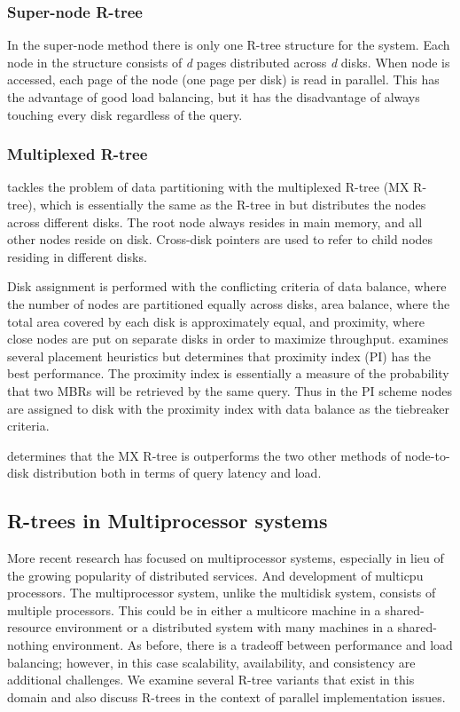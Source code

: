 \subsubsection{Super-node R-tree}
In the super-node method \cite{kamel1992parallel}\cite{thebook} there is only
one R-tree structure for the system. Each node in the structure consists of
\emph{d} pages distributed across \emph{d} disks. When node is accessed, each
page of the node (one page per disk) is read in parallel. This has the 
advantage of good load balancing, but it has the disadvantage of
always touching every disk regardless of the query.

\subsubsection{Multiplexed R-tree}
\cite{kamel1992parallel} tackles the problem of data partitioning with the 
multiplexed R-tree (MX R-tree), which is essentially the same as the R-tree 
in \cite{guttman84} but distributes the nodes across different disks. 
The root node always resides in main memory, and all other nodes reside on 
disk. Cross-disk pointers are used to refer to child nodes residing in 
different disks. 

Disk assignment is performed with the conflicting criteria of
data balance, where the number of nodes are partitioned equally across disks, 
area balance, where the total area covered by each disk is approximately 
equal, and proximity, where close nodes are put on separate disks in order to
maximize throughput. \cite{kamel1992parallel} examines several placement 
heuristics but determines that proximity index (PI) has the best performance. 
The proximity index is essentially a measure of the probability that two MBRs
will be retrieved by the same query. Thus in the PI scheme nodes are assigned 
to disk with the proximity index with data balance as the tiebreaker criteria.

\cite{kamel1992parallel} determines that the MX R-tree is outperforms the two
other methods of node-to-disk distribution both in terms of query latency and
load.
 
\subsection{R-trees in Multiprocessor systems}
More recent research has focused on multiprocessor systems, especially in 
lieu of the growing popularity of distributed services. And development of 
multicpu processors. 
The multiprocessor system, unlike the multidisk system, consists of multiple 
processors. This could be in either a multicore machine in a shared-resource
environment or a distributed system with many machines in a shared-nothing 
environment. As before, there is a tradeoff between performance and load 
balancing; however, in this case scalability, availability, and consistency
are additional challenges. We examine several R-tree variants that exist in
this domain and also discuss R-trees in the context of parallel implementation
issues.

